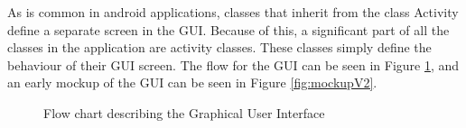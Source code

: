 As is common in android applications, classes that inherit from the class Activity define a separate screen in the GUI. Because of this, a significant part of all the classes in the application are activity classes. These classes simply define the behaviour of their GUI screen. The flow for the GUI can be seen in Figure \ref{fig:GUIFlowchart}, and an early mockup of the GUI can be seen in Figure \ref{fig:mockupV2}.
\begin{figure}
\setlength\fboxsep{0pt}
\setlength\fboxrule{1pt}\noindent{}
\caption{Flow chart describing the Graphical User Interface}
\label{fig:GUIFlowchart}
\end{figure}

